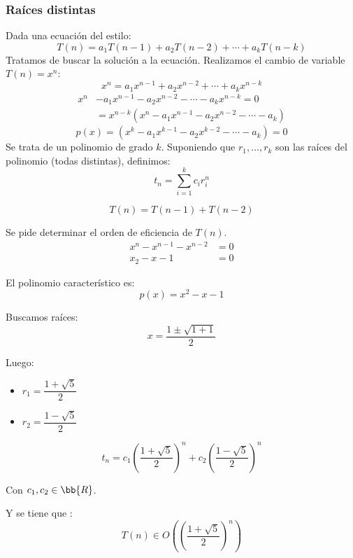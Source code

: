 \subsubsection{Raíces distintas}
Dada una ecuación del estilo:
\begin{equation*}
    T(n) = a_1T(n-1) + a_2T(n-2)+\cdots +a_kT(n-k)
\end{equation*}
Tratamos de buscar la solución a la ecuación. Realizamos el cambio de variable $T(n) = x^n$:
\begin{equation*}
    x^n = a_1 x^{n-1} + a_2 x^{n-2} + \cdots + a_k x^{n-k}
\end{equation*}
\begin{align*}
    x^n &- a_1 x^{n-1} - a_2 x^{n-2} - \cdots - a_k x^{n-k} = 0\\
        &= x^{n-k}(x^n -a_1x^{n-1} -a_2x^{n-2} - \cdots - a_k) 
\end{align*}
\begin{equation*}
    p(x) = (x^k -a_1x^{k-1} -a_2x^{k-2} - \cdots - a_k) = 0
\end{equation*}
Se trata de un polinomio de grado $k$. Suponiendo que $r_1, \ldots, r_k$ son las raíces del polinomio (todas distintas), definimos:
\begin{equation*}
    t_n = \sum_{i=1}^k c_i r_i^n
\end{equation*}

\begin{ejemplo}[Fibonacci]
\begin{equation*}
    T(n) = T(n-1)+T(n-2)
\end{equation*}

Se pide determinar el orden de eficiencia de $T(n)$.
\begin{align*}
    x^n - x^{n-1} - x^{n-2} &= 0 \\
    x_2 - x - 1 &= 0
\end{align*}

El polinomio característico es:
\begin{equation*}
    p(x) = x^2 - x -1
\end{equation*}

Buscamos raíces:
\begin{equation*}
    x = \dfrac{1\pm \sqrt{1+1}}{2}
\end{equation*}

Luego:
\begin{itemize}
    \item $r_1 = \dfrac{1+\sqrt{5}}{2}$
    \item $r_2 = \dfrac{1-\sqrt{5}}{2}$
\end{itemize}
\begin{equation*}
    t_n = c_1 \left(\dfrac{1+\sqrt{5}}{2}\right)^n + c_2 \left(\dfrac{1-\sqrt{5}}{2}\right)^n
\end{equation*}

Con $c_1, c_2 \in \bb{R}$.

Y se tiene que :
\begin{equation*}
    T(n) \in O\left(\left(\dfrac{1+\sqrt{5}}{2}\right)^n\right)
\end{equation*}
\end{ejemplo}

